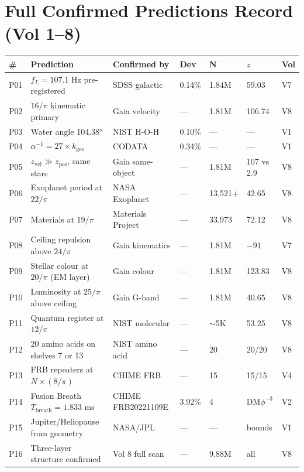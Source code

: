 \documentclass[12pt, letterpaper]{article}
\begin{document}
\section{Full Confirmed Predictions Record (Vol 1--8)}

\begin{longtable}{p{0.5cm} p{4cm} p{2.2cm} p{1.4cm} p{1.2cm} p{1.0cm} l}
\toprule
\# & Prediction & Confirmed by & Dev & N & $z$ & Vol \\
\midrule
\endhead

P01 & $f_L = 107.1$ Hz pre-registered & SDSS galactic &
  0.14\% & 1.84M & 59.03 & V7 \\
P02 & $16/\pi$ kinematic primary & Gaia velocity &
  --- & 1.81M & 106.74 & V8 \\
P03 & Water angle 104.38° & NIST H-O-H &
  0.10\% & --- & --- & V1 \\
P04 & $\alpha^{-1} = 27 \times k_\mathrm{geo}$ & CODATA &
  0.34\% & --- & --- & V1 \\
P05 & $z_\mathrm{vel} \gg z_\mathrm{pos}$, same stars & Gaia same-object &
  --- & 1.81M & 107 vs 2.9 & V8 \\
P06 & Exoplanet period at $22/\pi$ & NASA Exoplanet &
  --- & 13,521+ & 42.65 & V8 \\
P07 & Materials at $19/\pi$ & Materials Project &
  --- & 33,973 & 72.12 & V8 \\
P08 & Ceiling repulsion above $24/\pi$ & Gaia kinematics &
  --- & 1.81M & $-91$ & V7 \\
P09 & Stellar colour at $20/\pi$ (EM layer) & Gaia colour &
  --- & 1.81M & 123.83 & V8 \\
P10 & Luminosity at $25/\pi$ above ceiling & Gaia G-band &
  --- & 1.81M & 40.65 & V8 \\
P11 & Quantum register at $12/\pi$ & NIST molecular &
  --- & $\sim$5K & 53.25 & V8 \\
P12 & 20 amino acids on shelves 7 or 13 & NIST amino acid &
  --- & 20 & 20/20 & V8 \\
P13 & FRB repeaters at $N \times (8/\pi)$ & CHIME FRB &
  --- & 15 & 15/15 & V4 \\
P14 & Fusion Breath $T_\mathrm{breath} = 1.833$ ms &
  CHIME FRB20221109E & 3.92\% & 4 & DM$\phi^{-3}$ & V2 \\
P15 & Jupiter/Heliopause from geometry & NASA/JPL &
  --- & --- & bounds & V1 \\
P16 & Three-layer structure confirmed & Vol 8 full scan &
  --- & 9.88M & all & V8 \\
\bottomrule
\end{longtable}
\end{document}
